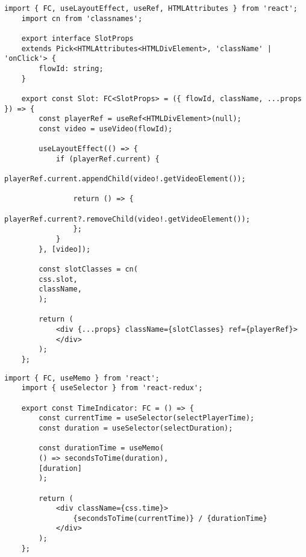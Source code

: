 \begin{lstlisting}[caption={Slot.tsx}]
	import { FC, useLayoutEffect, useRef, HTMLAttributes } from 'react';
	import cn from 'classnames';
	
	export interface SlotProps
	extends Pick<HTMLAttributes<HTMLDivElement>, 'className' | 'onClick'> {
		flowId: string;
	}
	
	export const Slot: FC<SlotProps> = ({ flowId, className, ...props }) => {
		const playerRef = useRef<HTMLDivElement>(null);
		const video = useVideo(flowId);
		
		useLayoutEffect(() => {
			if (playerRef.current) {
				playerRef.current.appendChild(video!.getVideoElement());
				
				return () => {
					playerRef.current?.removeChild(video!.getVideoElement());
				};
			}
		}, [video]);
		
		const slotClasses = cn(
		css.slot,
		className,
		);
		
		return (
			<div {...props} className={slotClasses} ref={playerRef}>
			</div>
		);
	};
\end{lstlisting}

\begin{lstlisting}[caption={TimeIndicator.tsx}]
	import { FC, useMemo } from 'react';
	import { useSelector } from 'react-redux';
	
	export const TimeIndicator: FC = () => {
		const currentTime = useSelector(selectPlayerTime);
		const duration = useSelector(selectDuration);
		
		const durationTime = useMemo(
		() => secondsToTime(duration),
		[duration]
		);
		
		return (
			<div className={css.time}>
				{secondsToTime(currentTime)} / {durationTime}
			</div>
		);
	};
\end{lstlisting}

